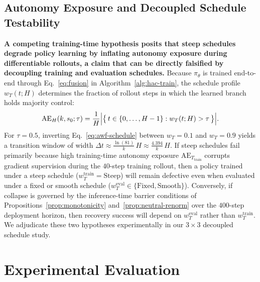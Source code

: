 \documentclass[11pt]{article}
\theoremstyle{plain}
\theoremstyle{definition}
\theoremstyle{remark}
\begin{document}
\subsection{Autonomy Exposure and Decoupled Schedule Testability}
\label{sec:curriculum}
\label{sec:prediction}
\textbf{A competing training-time hypothesis posits that steep schedules degrade policy learning by inflating autonomy exposure during differentiable rollouts, a claim that can be directly falsified by decoupling training and evaluation schedules.} Because $\pi_\theta$ is trained end-to-end through Eq.~\eqref{eq:fusion} in Algorithm~\ref{alg:hac-train}, the schedule profile $w_T(t; H)$ determines the fraction of rollout steps in which the learned branch holds majority control:
\begin{equation}
  \mathrm{AE}_H(k, s_0; \tau) = \frac{1}{H} \Bigl|
  \bigl\{\, t \in \{0,\dots,H-1\} : w_T(t; H) > \tau \,\bigr\}
  \Bigr|.
\end{equation}
For $\tau = 0.5$, inverting Eq.~\eqref{eq:awf-schedule} between $w_T = 0.1$ and $w_T = 0.9$ yields a transition window of width $\Delta t \approx \frac{\ln(81)}{k}\,H \approx \frac{4.394}{k}\,H$. If steep schedules fail primarily because high training-time autonomy exposure $\mathrm{AE}_{T_{\mathrm{train}}}$ corrupts gradient supervision during the $40$-step training rollout, then a policy trained under a steep schedule ($w_T^{\mathrm{train}} = \text{Steep}$) will remain defective even when evaluated under a fixed or smooth schedule ($w_T^{\mathrm{eval}} \in \{\text{Fixed}, \text{Smooth}\}$). Conversely, if collapse is governed by the inference-time barrier conditions of Propositions~\ref{prop:monotonicity} and~\ref{prop:neutral-renorm} over the $400$-step deployment horizon, then recovery success will depend on $w_T^{\mathrm{eval}}$ rather than $w_T^{\mathrm{train}}$. We adjudicate these two hypotheses experimentally in our $3 \times 3$ decoupled schedule study.

\section{Experimental Evaluation}
\label{sec:expsetup}
\label{sec:results}
\label{sec:ablation}
\end{document}
